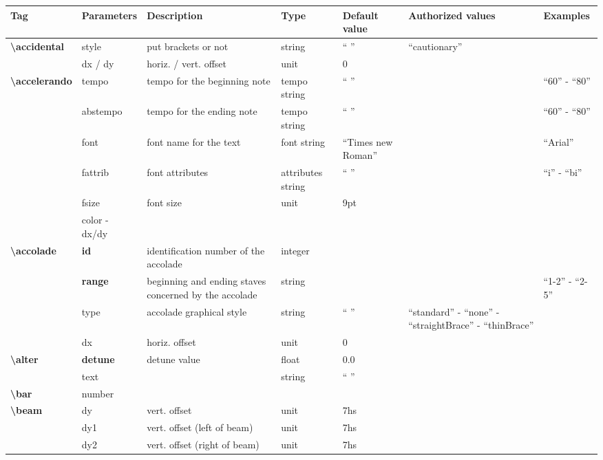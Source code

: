 \documentclass[a4paper, landscape, 10pt]{article}
\begin{document}
\begin{tabularx}{\linewidth}{p{3cm}p{2cm}p{5.5cm}p{2.5cm}p{3.5cm}p{4cm}p{3.5cm}}
    \hline
    \textbf{Tag}&\textbf{Parameters}&\textbf{Description}&\textbf{Type}&\textbf{Default value}&\textbf{Authorized values}&\textbf{Examples}\\
    \hline
    \textbf{\textbackslash{}accidental}&style&put brackets or not&string&`` ''&``cautionary''&\\
    &dx / dy&horiz. / vert. offset&unit&0&&\\
    \hline
    \textbf{\textbackslash{}accelerando}&tempo&tempo for the beginning note&tempo string&`` ''&&``60'' - ``80''\\
    &abstempo&tempo for the ending note&tempo string&`` ''&&``60'' - ``80''\\
    &font&font name for the text&font string&``Times new Roman''&&``Arial''\\
    &fattrib&font attributes&attributes string&`` ''&&``i'' - ``bi''\\
    &fsize&font size&unit&9pt&&\\
    &color - dx/dy&&&&&\\
    \hline
    \textbf{\textbackslash{}accolade}&\textbf{id}&identification number of the accolade&integer&&&\\
    &\textbf{range}&beginning and ending staves concerned by the accolade&string&&&``1-2'' - ``2-5''\\
    &type&accolade graphical style&string&`` ''&``standard'' - ``none'' - ``straightBrace'' - ``thinBrace''&\\
    &dx&horiz. offset&unit&0&&\\
    \hline
    \textbf{\textbackslash{}alter}&\textbf{detune}&detune value&float&0.0&&\\
    &text&&string&`` ''&&\\ %
    \hline
    \textbf{\textbackslash{}bar}&number&&&&&\\ %
    \hline
    \textbf{\textbackslash{}beam}&dy&vert. offset&unit&7hs&&\\
    &dy1&vert. offset (left of beam)&unit&7hs&&\\
    &dy2&vert. offset (right of beam)&unit&7hs&&\\

\end{tabularx}
\end{document}
